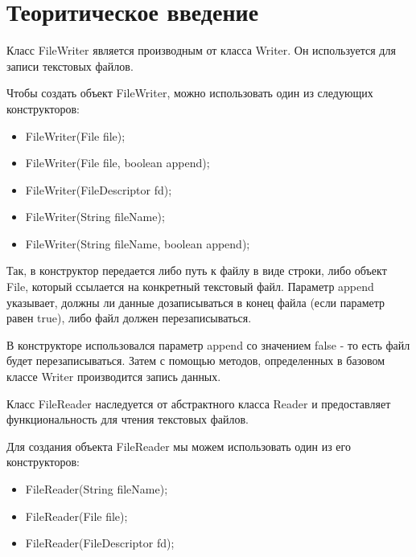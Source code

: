 \documentclass[14pt, a4paper]{extarticle}
\begin{document}
\makeatletter
\renewcommand{\l@section}{\@dottedtocline{1}{0em}{1.25em}}
\renewcommand{\l@subsection}{\@dottedtocline{2}{0em}{1.75em}}
\renewcommand{\l@subsubsection}{\@dottedtocline{3}{0em}{2.6em}}
\renewcommand{\@dotsep}{1.25}
\makeatother

\def\contentsname{СОДЕРЖАНИЕ}

\begin{titlepage}

\end{titlepage}

\section*{Теоритическое введение}
Класс FileWriter является производным от класса Writer. Он
используется для записи текстовых файлов.

Чтобы создать объект FileWriter, можно использовать один из
следующих конструкторов:
\begin{itemize}
\item FileWriter(File file);
\item FileWriter(File file, boolean append);
\item FileWriter(FileDescriptor fd);
\item FileWriter(String fileName);
\item FileWriter(String fileName, boolean append);
\end{itemize}

Так, в конструктор передается либо путь к файлу в виде строки,
либо объект File, который ссылается на конкретный текстовый файл.
Параметр append указывает, должны ли данные дозаписываться в конец
файла (если параметр равен true), либо файл должен перезаписываться.

В конструкторе использовался параметр append со значением false
- то есть файл будет перезаписываться. Затем с помощью методов,
определенных в базовом классе Writer производится запись данных.

Класс FileReader наследуется от абстрактного класса Reader и
предоставляет функциональность для чтения текстовых файлов.

Для создания объекта FileReader мы можем использовать один из
его конструкторов:
\begin{itemize}
\item FileReader(String fileName);
\item FileReader(File file);
\item FileReader(FileDescriptor fd);
\end{itemize}
\end{document}
